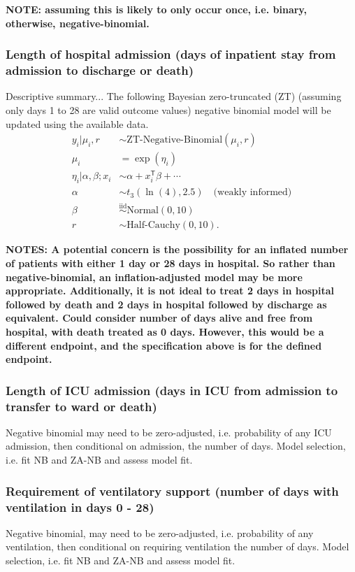 \documentclass[11pt,parskip=half-]{scrartcl}
\begin{document}
\textbf{NOTE: assuming this is likely to only occur once, i.e. binary, otherwise, negative-binomial.}

\subsubsection{Length of hospital admission (days of inpatient stay from admission to discharge or death)}
Descriptive summary... The following Bayesian zero-truncated (ZT) (assuming only days 1 to 28 are valid outcome values) negative binomial model will be updated using the available data.
$$
    \begin{aligned}
        y_i|\mu_i,r                 & \sim \text{ZT-Negative-Binomial}(\mu_i, r)           \\
        \mu_i                       & = \exp(\eta_i)                                       \\
        \eta_i | \alpha, \beta; x_i & \sim \alpha + x_i^\mathsf{T}\beta + \cdots           \\
        \alpha                      & \sim t_3(\ln(4), 2.5) \quad \text{(weakly informed)} \\
        \beta                       & \overset{\text{iid}}{\sim} \text{Normal}(0, 10)      \\
        r                           & \sim \text{Half-Cauchy}(0, 10).
    \end{aligned}
$$

\textbf{NOTES: A potential concern is the possibility for an inflated number of patients with either 1 day or 28 days in hospital. So rather than negative-binomial, an inflation-adjusted model may be more appropriate. Additionally, it is not ideal to treat 2 days in hospital followed by death and 2 days in hospital followed by discharge as equivalent. Could consider number of days alive and free from hospital, with death treated as 0 days. However, this would be a different endpoint, and the specification above is for the defined endpoint.}

\subsubsection{Length of ICU admission (days in ICU from admission to transfer to ward or death)}
Negative binomial may need to be zero-adjusted, i.e. probability of any ICU admission, then conditional on admission, the number of days. Model selection, i.e. fit NB and ZA-NB and assess model fit.

\subsubsection{Requirement of ventilatory support (number of days with ventilation in days 0 - 28)}
Negative binomial, may need to be zero-adjusted, i.e. probability of any ventilation, then conditional on requiring ventilation the number of days. Model selection, i.e. fit NB and ZA-NB and assess model fit.
\end{document}
